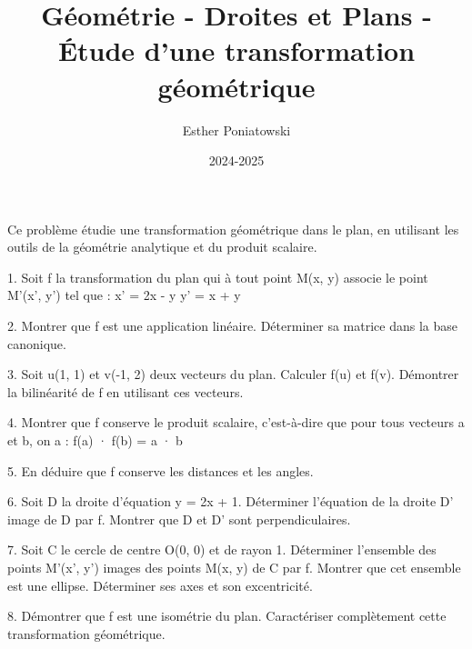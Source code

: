 \documentclass[10pt,a4paper]{article}
\title{Géométrie - Droites et Plans - Étude d'une transformation géométrique}
\author{Esther Poniatowski}
\date{2024-2025}
\begin{document}
\maketitle

Ce problème étudie une transformation géométrique dans le plan, en utilisant les outils de la géométrie analytique et du produit scalaire.

1. Soit f la transformation du plan qui à tout point M(x, y) associe le point M'(x', y') tel que :
   x' = 2x - y
   y' = x + y

2. Montrer que f est une application linéaire. Déterminer sa matrice dans la base canonique.

3. Soit u(1, 1) et v(-1, 2) deux vecteurs du plan.
  \ql Calculer f(u) et f(v).
  \ql Démontrer la bilinéarité de f en utilisant ces vecteurs.

4. Montrer que f conserve le produit scalaire, c'est-à-dire que pour tous vecteurs a et b, on a :
   f(a) · f(b) = a · b

5. En déduire que f conserve les distances et les angles.

6. Soit D la droite d'équation y = 2x + 1.
  \ql Déterminer l'équation de la droite D' image de D par f.
  \ql Montrer que D et D' sont perpendiculaires.

7. Soit C le cercle de centre O(0, 0) et de rayon 1.
  \ql Déterminer l'ensemble des points M'(x', y') images des points M(x, y) de C par f.
  \ql Montrer que cet ensemble est une ellipse. Déterminer ses axes et son excentricité.

8. Démontrer que f est une isométrie du plan. Caractériser complètement cette transformation géométrique.
\end{document}
